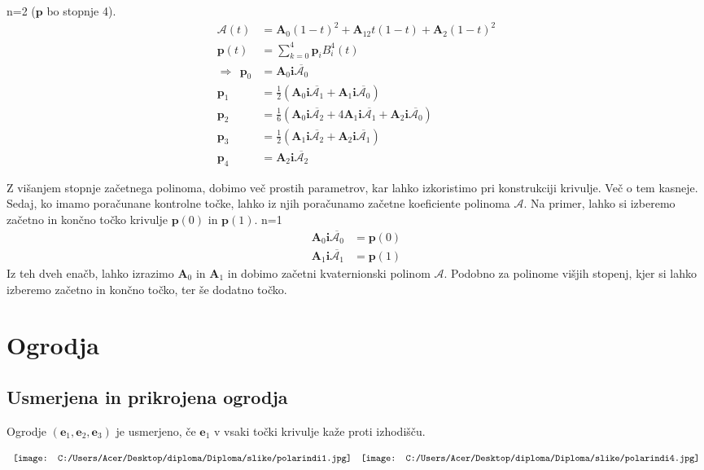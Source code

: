 \documentclass[mat1]{fmfdelo}
\newcommand{\ii}{\boldsymbol i}
\newcommand{\pp}{\boldsymbol p}
\newcommand{\ba}{\boldsymbol A}
\newcommand{\e}{\boldsymbol e}
\newcommand{\A}{\mathcal A}
\begin{document}
\begin{primer}
n=2 ($\pp$ bo stopnje 4).
\begin{equation*}
\begin{split}
\A(t) &= \ba_0(1-t)^2 + \ba_12t(1-t) + \ba_2(1-t)^2\\
\pp(t)& = \sum_{k=0}^4\pp_iB_i^4(t) \\
\Longrightarrow ~~\pp_0 & = \ba_0\ii\overline{\A_0} \\
\pp_1 &= \frac{1}{2}\left( \ba_0\ii\overline{\A_1} + \ba_1\ii\overline{\A_0} \right) \\
\pp_2 &= \frac{1}{6} \left( \ba_0\ii\overline{\A_2} + 4\ba_1\ii\overline{\A_1}+\ba_2\ii\overline{\A_0} \right) \\
\pp_3 &= \frac{1}{2} \left( \ba_1\ii\overline{\A_2}+\ba_2\ii\overline{\A_1} \right) \\
\pp_4 &= \ba_2\ii\overline{\A_2}
\end{split}
\end{equation*}
\end{primer}
Z višanjem stopnje začetnega polinoma, dobimo več prostih parametrov, kar lahko izkoristimo pri konstrukciji krivulje. Več o tem kasneje.\\
Sedaj, ko imamo poračunane kontrolne točke, lahko iz njih poračunamo začetne koeficiente polinoma $\A$. Na primer, lahko si izberemo začetno in končno točko krivulje $\pp(0)$ in $\pp(1)$. n=1
\begin{equation*}
\begin{split}
\ba_0\ii\overline{\A_0} &= \pp(0) \\
\ba_1\ii\overline{\A_1} &= \pp(1)
\end{split}
\end{equation*}
Iz teh dveh enačb, lahko izrazimo $\ba_0$ in $\ba_1$ in dobimo začetni kvaternionski polinom $\A$. Podobno za polinome višjih stopenj, kjer si lahko izberemo začetno in končno točko, ter še dodatno točko.


\section{Ogrodja}
\subsection{Usmerjena in prikrojena ogrodja}
\begin{definicija}
Ogrodje $(\e_1,\e_2,\e_3)$ je usmerjeno, če $\e_1$ v vsaki točki krivulje kaže proti izhodišču.
\end{definicija}
\begin{equation*}
\begin{array}{c c}
\texttt{[image: C:/Users/Acer/Desktop/diploma/Diploma/slike/polarindi1.jpg]} &
\texttt{[image: C:/Users/Acer/Desktop/diploma/Diploma/slike/polarindi4.jpg]}
\end{array}
\end{equation*}
\end{document}
